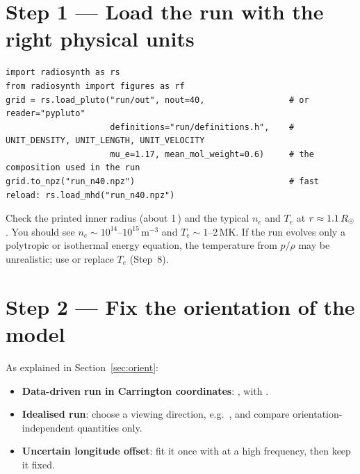 \section*{Step 1 --- Load the run with the right physical units}
\begin{lstlisting}[style=pyex]
import radiosynth as rs
from radiosynth import figures as rf
grid = rs.load_pluto("run/out", nout=40,                 # or reader="pypluto"
                     definitions="run/definitions.h",    # UNIT_DENSITY, UNIT_LENGTH, UNIT_VELOCITY
                     mu_e=1.17, mean_mol_weight=0.6)     # the composition used in the run
grid.to_npz("run_n40.npz")                               # fast reload: rs.load_mhd("run_n40.npz")
\end{lstlisting}
Check the printed inner radius (about 1\,\rsun) and the typical $n_e$ and $T_e$ at
$r\approx1.1\,R_\odot$. You should see $n_e\sim10^{14}$--$10^{15}$\,m$^{-3}$ and
$T_e\sim1$--2\,MK. If the run evolves only a polytropic or isothermal energy equation,
the temperature from $p/\rho$ may be unrealistic; use  or replace $T_e$
(Step~8).

\section*{Step 2 --- Fix the orientation of the model}
As explained in Section~\ref{sec:orient}:
\begin{itemize}[itemsep=1pt]
\item \textbf{Data-driven run in Carrington coordinates}:
      , with .
\item \textbf{Idealised run}: choose a viewing direction, e.g.\
      , and compare orientation-independent quantities only.
\item \textbf{Uncertain longitude offset}: fit it once with
       at a high frequency, then keep it fixed.
\end{itemize}

